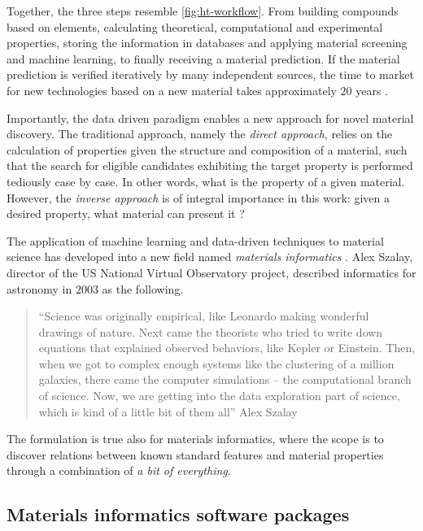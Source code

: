 \noindent Together, the three steps resemble \autoref{fig:ht-workflow}. From building compounds based on elements, calculating theoretical, computational and experimental properties, storing the information in databases and applying material screening and machine learning, to finally receiving a material prediction. If the material prediction is verified iteratively by many independent sources, the time to market for new technologies based on a new material takes approximately $20$ years \cite{Eagar1995, Schleder2019}.

Importantly, the data driven paradigm enables a new approach for novel material discovery. The traditional approach, namely the \textit{direct approach}, relies on the calculation of properties given the structure and composition of a material, such that the search for eligible candidates exhibiting the target property is performed tediously case by case. In other words, what is the property of a given material. However, the \textit{inverse approach} is of integral importance in this work: given a desired property, what material can present it \cite{Schleder2019}?

The application of machine learning and data-driven techniques to material science has developed into a new field named \textit{materials informatics} \cite{Rajan2005}. Alex Szalay, director of the US National Virtual Observatory project, described informatics for astronomy in $2003$ as the following.
\begin{quote}
   ``Science was originally empirical, like Leonardo making wonderful drawings of nature. Next came the theorists who tried to write down equations that explained observed behaviors, like Kepler or Einstein. Then, when we got to complex enough systems like the clustering of a million galaxies, there came the computer simulations – the computational branch of science. Now, we are getting into the data exploration part of science, which is kind of a little bit of them all'' Alex Szalay \cite{Szalay2003}
\end{quote}
\noindent The formulation is true also for materials informatics, where the scope is to discover relations between known standard features and material properties through a combination of \emph{a bit of everything}.

\subsection{Materials informatics software packages}

